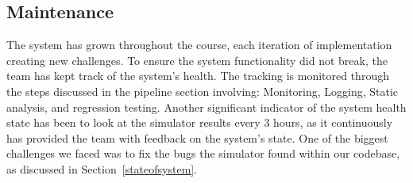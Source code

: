 \subsection{Maintenance}

The system has grown throughout the course, each iteration of implementation creating new challenges. To ensure the system functionality did not break, the team has kept track of the system's health. The tracking is monitored through the steps discussed in the pipeline section involving: Monitoring, Logging, Static analysis, and regression testing. Another significant indicator of the system health state has been to look at the simulator results every 3 hours, as it continuously has provided the team with feedback on the system's state. One of the biggest challenges we faced was to fix the bugs the simulator found within our codebase, as discussed in Section~\ref{stateofsystem}.


